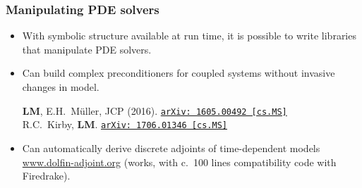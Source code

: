 \documentclass[presentation]{beamer}
\newcommand{\arxivlink}[2]{%
  \href{http://www.arxiv.org/abs/#1}%
  {\texttt{arXiv:\,#1\,[#2]}}%
}
\begin{document}
\begin{frame}[fragile]
\begin{uncoverenv}
\begin{center}
  \end{center}
  \end{uncoverenv}
\end{frame}

\begin{frame}
  \frametitle{Manipulating PDE solvers}
  \begin{itemize}
  \item With symbolic structure available at run time, it is possible
    to write libraries that manipulate PDE solvers.
  \item Can build complex preconditioners for coupled systems without
    invasive changes in model.
    \begin{flushright}
      {\scriptsize \textbf{LM}, E.H.~M\"uller, JCP (2016).
        \arxivlink{1605.00492}{cs.MS}}\\
      {\scriptsize R.C.~Kirby, \textbf{LM}. \arxivlink{1706.01346}{cs.MS}}
    \end{flushright}
  \item Can automatically derive discrete adjoints of
    time-dependent models \url{www.dolfin-adjoint.org} (works, with
    c.~100 lines compatibility code with Firedrake).
  \end{itemize}
\end{frame}
\end{document}
